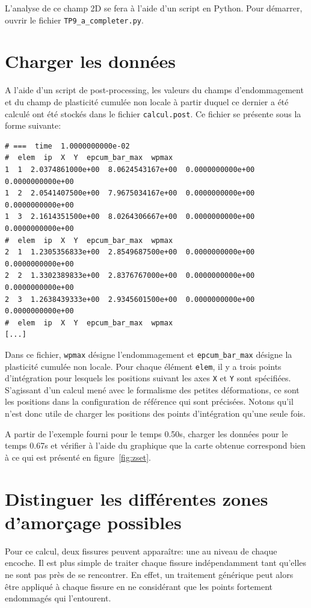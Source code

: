 \documentclass[french,12pt]{exam}
\begin{document}
L'analyse de ce champ 2D se fera à l'aide d'un script en Python. Pour démarrer, ouvrir le fichier \texttt{TP9\_a\_completer.py}.

\section{Charger les données}
A l'aide d'un script de post-processing, les valeurs du champs d'endommagement et du champ de plasticité cumulée non locale à partir duquel ce dernier a été calculé ont été stockés dans le fichier \texttt{calcul.post}. Ce fichier se présente sous la forme suivante: 
\begin{lstlisting}
# ===  time  1.0000000000e-02
#  elem  ip  X  Y  epcum_bar_max  wpmax  
1  1  2.0374861000e+00  8.0624543167e+00  0.0000000000e+00  0.0000000000e+00  
1  2  2.0541407500e+00  7.9675034167e+00  0.0000000000e+00  0.0000000000e+00  
1  3  2.1614351500e+00  8.0264306667e+00  0.0000000000e+00  0.0000000000e+00  
#  elem  ip  X  Y  epcum_bar_max  wpmax  
2  1  1.2305356833e+00  2.8549687500e+00  0.0000000000e+00  0.0000000000e+00  
2  2  1.3302389833e+00  2.8376767000e+00  0.0000000000e+00  0.0000000000e+00  
2  3  1.2638439333e+00  2.9345601500e+00  0.0000000000e+00  0.0000000000e+00  
#  elem  ip  X  Y  epcum_bar_max  wpmax  
[...]
\end{lstlisting}
Dans ce fichier, \texttt{wpmax} désigne l'endommagement et \texttt{epcum\_bar\_max} désigne la plasticité cumulée non locale. Pour chaque élément \texttt{elem}, il y a trois points d'intégration pour lesquels les positions suivant les axes \texttt{X} et \texttt{Y} sont spécifiées. S'agissant d'un calcul mené avec le formalisme des petites déformations, ce sont les positions dans la configuration de référence qui sont précisées. Notons qu'il n'est donc utile de charger les positions des points d'intégration qu'une seule fois.\\

\begin{questions}
\question A partir de l'exemple fourni pour le temps 0.50s, charger les données pour le temps 0.67s et vérifier à l'aide du graphique que la carte obtenue correspond bien à ce qui est présenté en figure~\ref{fig:zset}.
\end{questions}

\section{Distinguer les différentes zones d'amorçage possibles}
Pour ce calcul, deux fissures peuvent apparaître: une au niveau de chaque encoche. Il est plus simple de traiter chaque fissure indépendamment tant qu'elles ne sont pas près de se rencontrer. En effet, un traitement générique peut alors être appliqué à chaque fissure en ne considérant que les points fortement endommagés qui l'entourent. 
\end{document}
